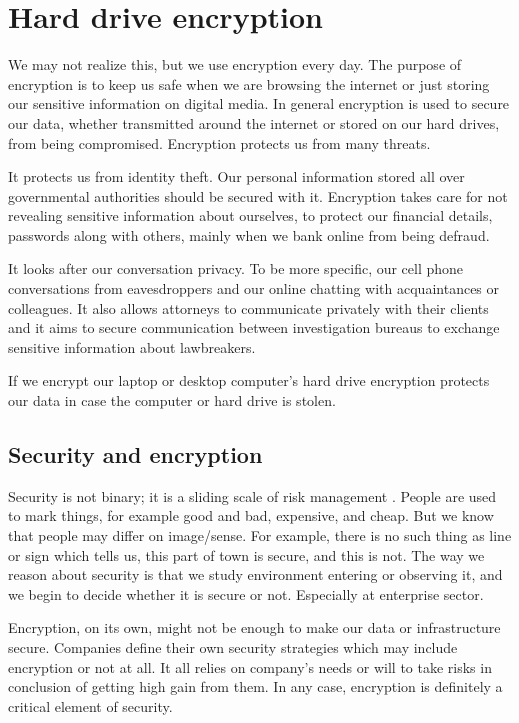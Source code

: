 \documentclass[../xdudla00-porting-Tang-to-Open-WRT.tex]{subfiles}
\begin{document}
\chapter{Hard drive encryption}\label{encryption}


We may not realize this, but we use encryption every day.
The purpose of encryption is to keep us safe when we are browsing the internet or just storing our sensitive information on digital media. 
In general encryption is used to secure our data, whether transmitted around the internet or stored on our hard drives, from being compromised.
Encryption protects us from many threats.

It protects us from identity theft. 
Our personal information stored all over governmental authorities should be secured with it.
Encryption takes care for not revealing sensitive information about ourselves, to protect our financial details, passwords along with others, mainly when we bank online from being defraud.

It looks after our conversation privacy. 
To be more specific, our cell phone conversations from eavesdroppers and our online chatting with acquaintances or colleagues. 
It also allows attorneys to communicate privately with their clients and it aims to secure communication between investigation bureaus to exchange sensitive information about lawbreakers.

If we encrypt our laptop or desktop computer's hard drive encryption protects our data in case the computer or hard drive is stolen.

\section{Security and encryption}

Security is not binary; it is a sliding scale of risk management \cite{devconf}.
People are used to mark things, for example good and bad, expensive, and cheap.
But we know that people may differ on image/sense.
For example, there is no such thing as line or sign which tells us, this part of town is secure, and this is not. 
The way we reason about security is that we study environment entering or observing it, and we begin to decide whether it is secure or not. 
Especially at enterprise sector. 

Encryption, on its own, might not be enough to make our data or infrastructure secure.
Companies define their own security strategies which may include encryption or not at all. 
It all relies on company's needs or will to take risks in conclusion of getting high gain from them.
In any case, encryption is definitely a critical element of security.
\end{document}
